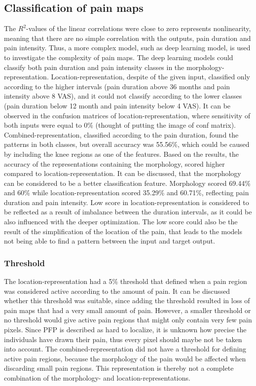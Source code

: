 \subsection*{Classification of pain maps}
The $R^2$-values of the linear correlations were close to zero represents nonlinearity, meaning that there are no simple correlation with the outputs, pain duration and pain intensity. Thus, a more complex model, such as deep learning model, is used to investigate the complexity of pain maps.
The deep learning models could classify both pain duration and pain intensity classes in the morphology-representation. Location-representation, despite of the given input, classified only according to the higher intervals (pain duration above 36 months and pain intensity above 8 VAS), and it could not classify according to the lower classes (pain duration below 12 month and pain intensity below 4 VAS). It can be observed in the confusion matrices of location-representation, where sensitivity of both inputs were equal to 0\% (thought of putting the image of conf matrix). Combined-representation, classified according to the pain duration, found the patterns in both classes, but overall accuracy was 55.56\%, which could be caused by including the knee regions as one of the features.
Based on the results, the accuracy of the representations containing the morphology, scored higher compared to location-representation. It can be discussed, that the morphology can be considered to be a better classification feature. Morphology scored 69.44\% and 60\% while location-representation scored 35.29\% and 60.71\%, reflecting pain duration and pain intensity.
Low score in location-representation is considered to be reflected as a result of imbalance between the duration intervals, as it could be also influenced with the deeper optimization. 
The low score could also be the result of the simplification of the location of the pain, that leads to the models not being able to find a pattern between the input and target output.  





\subsubsection*{Threshold } 
The location-representation had a 5\% threshold that defined when a pain region was considered active according to the amount of pain. It can be discussed whether this threshold was suitable, since adding the threshold resulted in loss of pain maps that had a very small amount of pain. However, a smaller threshold or no threshold would give active pain regions that might only contain very few pain pixels. Since PFP is described as hard to localize, it is unknown how precise the individuals have drawn their pain, thus every pixel should maybe not be taken into account. 
The combined-representation did not have a threshold for defining active pain regions, because the morphology of the pain would be affected when discarding small pain regions. 
This representation is thereby not a complete combination of the morphology- and location-representations. 

